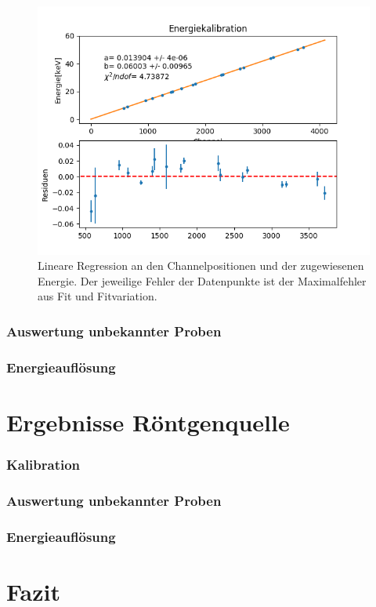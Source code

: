 \documentclass[12pt,a4paper]{article}
\begin{document}
\begin{figure}
\centering
\includegraphics[scale=0.8]{Bilder/alpha/kal.png}
\caption{Lineare Regression an den Channelpositionen und der zugewiesenen Energie. Der jeweilige Fehler der Datenpunkte ist der Maximalfehler aus Fit und Fitvariation.}
\label{fig:kal_linreg}
\end{figure}

\subsubsection{Auswertung unbekannter Proben}
\subsubsection{Energieauflösung}
\section{Ergebnisse Röntgenquelle}
\subsubsection{Kalibration}
\subsubsection{Auswertung unbekannter Proben}
\subsubsection{Energieauflösung}

\section{Fazit}
\end{document}
